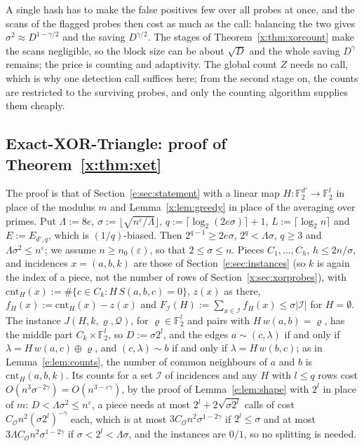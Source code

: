 \documentclass[11pt]{article}
\theoremstyle{definition}
\theoremstyle{remark}
\newcommand{\F}{\mathbb{F}_2}
\newcommand{\cnt}{\mathrm{cnt}}
\newcommand{\Iq}{\mathcal{I}}
\begin{document}
A single hash has to make the false positives few over all probes at once, and the scans of the flagged probes then cost as much as the call: balancing the two gives $\sigma^2\approx D^{1-\gamma/2}$ and the saving $D^{\gamma/2}$. The stages of Theorem~\ref{x:thm:xorcount} make the scans negligible, so the block size can be about $\sqrt D$ and the whole saving $D^\gamma$ remains; the price is counting and adaptivity. The global count $Z$ needs no call, which is why one detection call suffices here; from the second stage on, the counts are restricted to the surviving probes, and only the counting algorithm supplies them cheaply.

\subsection{Exact-XOR-Triangle: proof of Theorem~\ref{x:thm:xet}}\label{x:sec:xet}

The proof is that of Section~\ref{e:sec:statement} with a linear map $H\colon\F^{d'}\to\F^l$ in place of the modulus $m$ and Lemma~\ref{x:lem:greedy} in place of the averaging over primes. Put $\Lambda:=8e$, $\sigma:=\lfloor\sqrt{n^\varepsilon/\Lambda}\rfloor$, $q:=\lceil\log_2(2e\sigma)\rceil+1$, $L:=\lceil\log_2n\rceil$ and $E:=E_{d',q}$, which is $(1/q)$-biased. Then $2^{q-1}\ge2e\sigma$, $2^q<\Lambda\sigma$, $q\ge3$ and $\Lambda\sigma^2\le n^\varepsilon$; we assume $n\ge n_0(\varepsilon)$, so that $2\le\sigma\le n$. Pieces $C_1,\dots,C_h$, $h\le2n/\sigma$, and incidences $x=(a,b,k)$ are those of Section~\ref{e:sec:instances} (so $k$ is again the index of a piece, not the number of rows of Section~\ref{x:sec:xorprobes}), with $\cnt_H(x):=\#\{c\in C_k:H\,S(a,b,c)=0\}$, $z(x)$ as there, $f_H(x):=\cnt_H(x)-z(x)$ and $F_\Iq(H):=\sum_{x\in\Iq}f_H(x)\le\sigma|\Iq|$ for $H=\emptyset$. The instance $J(H,k,\varrho,\mathcal Q)$, for $\varrho\in\F^l$ and pairs with $H\,w(a,b)=\varrho$, has the middle part $C_k\times\F^l$, so $D:=\sigma2^l$, and the edges $a\sim(c,\lambda)$ if and only if $\lambda=H\,w(a,c)\oplus\varrho$, and $(c,\lambda)\sim b$ if and only if $\lambda=H\,w(b,c)$; as in Lemma~\ref{e:lem:counts}, the number of common neighbours of $a$ and $b$ is $\cnt_H(a,b,k)$. Its counts for a set $\Iq$ of incidences and any $H$ with $l\le q$ rows cost $O(n^3\sigma^{-2\gamma})=O(n^{3-\varepsilon\gamma})$, by the proof of Lemma~\ref{e:lem:shape} with $2^l$ in place of $m$: $D<\Lambda\sigma^2\le n^\varepsilon$, a piece needs at most $2^l+2\sqrt{\sigma2^l}$ calls of cost $C_{\mathcal O}n^2(\sigma2^l)^{-\gamma}$ each, which is at most $3C_{\mathcal O}n^2\sigma^{1-2\gamma}$ if $2^l\le\sigma$ and at most $3\Lambda C_{\mathcal O}n^2\sigma^{1-2\gamma}$ if $\sigma<2^l<\Lambda\sigma$, and the instances are $0/1$, so no splitting is needed.
\end{document}
